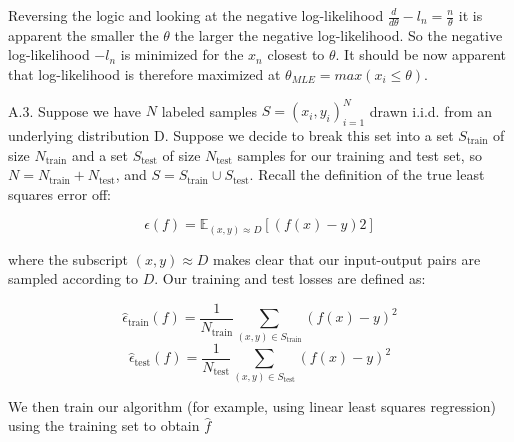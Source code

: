\documentclass{article}
\newcommand{\1}{\mathbf{1}}
\newcommand{\E}{\mathbb{E}}
\begin{document}
Reversing the logic and looking at the negative log-likelihood $\frac{d}{d\theta}-l_n  = \frac{n}{\theta}$ it is apparent the smaller the $\theta$ the larger the negative log-likelihood. So the negative log-likelihood $-l_n$ is minimized for the $x_n$ closest to $\theta$. It should be now apparent that log-likelihood is therefore maximized at $\theta_{MLE}=max(x_i \leq \theta)$. 


\newpage
A.3.  Suppose we have $N$ labeled samples $S={(x_i,y_i)}^N_{i=1}$ drawn i.i.d. from an underlying distribution D. Suppose we decide to break this set into a set $S_\text{train}$ of size $N_\text{train}$ and a set $S_\text{test}$ of size $N_\text{test}$ samples for our training and test set, so $N = N_{\text{train}} + N_{\text{test}}$, and $S = S_{\text{train}} \cup S_{\text{test}}$.  Recall the definition of the true least squares error off:

$$\epsilon(f) = \E_{(x,y)\approx D}[(f(x)-y)2]$$

where the subscript $(x,y)\approx D$ makes clear that our input-output pairs are sampled according to $D$. Our training and test losses are defined as: 

$$\widehat\epsilon_{\text{train}}(f) = \frac{1}{N_\text{train}}\sum_{(x,y)\in S_\text{train}}(f(x)-y)^2$$
$$\widehat\epsilon_{\text{test}}(f) = \frac{1}{N_\text{test}}\sum_{(x,y)\in S_\text{test}}(f(x)-y)^2$$

We then train our algorithm (for example, using linear least squares regression) using the training set to obtain $\hat f$
\end{document}
